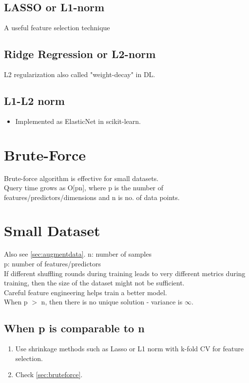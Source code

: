 \documentclass[a4paper, 12pt]{report}
\begin{document}
\subsection{LASSO or L1-norm}
A useful feature selection technique

\subsection{Ridge Regression or L2-norm}
L2 regularization also called "weight-decay" in DL.

\subsection{L1-L2 norm}
\begin{itemize}
\item Implemented as ElasticNet in {\color{red}scikit-learn}.
\end{itemize}
\section{Brute-Force}
\label{sec:bruteforce}

Brute-force algorithm is effective for small datasets.\\
Query time grows as O[pn], where p is the number of features/predictors/dimensions and n is no. of data points.

\section{Small Dataset}
Also see  \autoref{sec:augmentdata}.
\label{sec:smalldatasize}
n: number of samples\\
p: number of features/predictors\\

If different shuffling rounds during training leads to very different metrics during training, then the size of the dataset might not be sufficient.\\

Careful feature engineering helps train a better model.\\

When p $>$ n, then there is no unique solution - variance is $\infty$.
\subsection{When p is comparable to n}
\begin{enumerate}

\item Use shrinkage methods such as Lasso or L1 norm with k-fold CV for feature selection.
\item Check  \autoref{sec:bruteforce}.

\end{enumerate}
\end{document}
